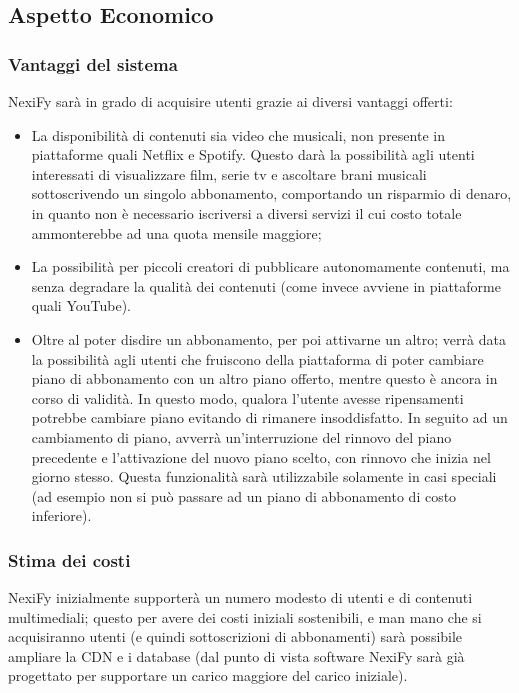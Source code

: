 \subsection{Aspetto Economico}
\subsubsection{Vantaggi del sistema}

NexiFy sarà in grado di acquisire utenti grazie ai diversi vantaggi offerti:
    \begin{itemize}
       	\item La disponibilità di contenuti sia video che musicali, non presente in piattaforme quali Netflix e Spotify. Questo darà la possibilità agli utenti interessati di visualizzare film, serie tv e ascoltare brani musicali sottoscrivendo un singolo abbonamento, comportando un risparmio di denaro, in quanto non è necessario iscriversi a diversi servizi il cui costo totale ammonterebbe ad una quota mensile maggiore;
        	\item La possibilità per piccoli creatori di pubblicare autonomamente contenuti, ma senza degradare la qualità dei contenuti (come invece avviene in piattaforme quali YouTube).
	\item\label{VantaggioSistema_cambioPiano} Oltre al poter disdire un abbonamento, per poi attivarne un altro; verrà data la possibilità agli utenti che fruiscono della
	piattaforma di poter cambiare piano di abbonamento con un altro piano
	offerto, mentre questo è ancora in corso di validità.
	In questo modo, qualora l'utente avesse ripensamenti potrebbe cambiare piano evitando di rimanere insoddisfatto.
	In seguito ad un cambiamento di piano, avverrà un'interruzione del rinnovo del piano
	precedente e l'attivazione del nuovo piano scelto, con rinnovo che inizia nel giorno stesso. Questa funzionalità sarà utilizzabile solamente in casi speciali (ad esempio non si può passare ad un piano di abbonamento di costo inferiore).
	\end{itemize}
\subsubsection{Stima dei costi}

NexiFy inizialmente supporterà un numero modesto di utenti e di contenuti multimediali; questo per avere dei costi iniziali sostenibili, e man mano che si acquisiranno utenti (e quindi sottoscrizioni di abbonamenti) sarà possibile ampliare la CDN e i database (dal punto di vista software NexiFy sarà già progettato per supportare un carico maggiore del carico iniziale).\\ \\

